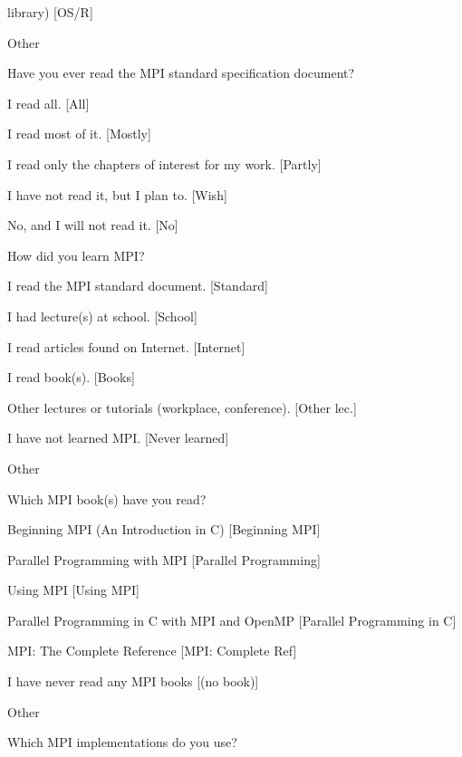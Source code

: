 \documentclass[preprint,5p,times]{elsarticle}
\begin{document}
{\begin{description}
\begin{inparaenum}[{\bf C}1)]
      library) [OS/R]
    \item Other
    \end{inparaenum}
  \item[Q9:] Have you ever read the MPI standard specification document?
    \begin{inparaenum}[{\bf C}1)]
    \item I read all. [All]
    \item I read most of it. [Mostly]
    \item I read only the chapters of interest for my work. [Partly]
    \item I have not read it, but I plan to. [Wish]
    \item No, and I will not read it. [No]
    \end{inparaenum}
  \item[Q10*:] How did you learn MPI?
    \begin{inparaenum}[{\bf C}1)]
    \item I read the MPI standard document. [Standard]
    \item I had lecture(s) at school. [School]
    \item I read articles found on Internet. [Internet]
    \item I read book(s). [Books]
    \item Other lectures or tutorials (workplace, conference). [Other lec.]
    \item I have not learned MPI. [Never learned]
    \item Other
    \end{inparaenum}
  \item[Q11*:] Which MPI book(s) have you read?
    \begin{inparaenum}[{\bf C}1)]
    \item Beginning MPI (An Introduction in C) [Beginning MPI]
    \item Parallel Programming with MPI [Parallel Programming]
    \item Using MPI [Using MPI]
    \item Parallel Programming in C with MPI and OpenMP [Parallel
      Programming in C]
    \item MPI: The Complete Reference [MPI: Complete Ref]
    \item I have never read any MPI books [(no book)]
    \item Other
    \end{inparaenum}
  \item[Q12*:] Which MPI implementations do you use?

\end{description}}
\end{document}
